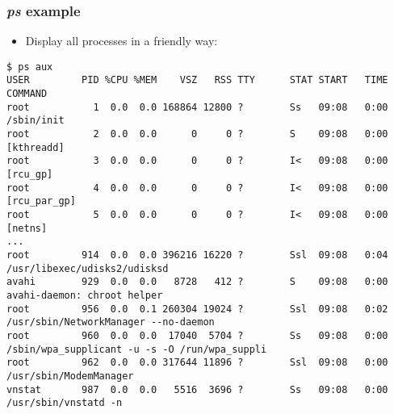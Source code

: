\begin{frame}[fragile]
  \frametitle{{\em ps} example}
  \begin{itemize}
  \frametitle{Processes with {\em ps}}
    \item Display all processes in a friendly way:
  \end{itemize}
  \begin{block}{}
    \begin{verbatim}
$ ps aux
USER         PID %CPU %MEM    VSZ   RSS TTY      STAT START   TIME COMMAND
root           1  0.0  0.0 168864 12800 ?        Ss   09:08   0:00 /sbin/init
root           2  0.0  0.0      0     0 ?        S    09:08   0:00 [kthreadd]
root           3  0.0  0.0      0     0 ?        I<   09:08   0:00 [rcu_gp]
root           4  0.0  0.0      0     0 ?        I<   09:08   0:00 [rcu_par_gp]
root           5  0.0  0.0      0     0 ?        I<   09:08   0:00 [netns]
...
root         914  0.0  0.0 396216 16220 ?        Ssl  09:08   0:04 /usr/libexec/udisks2/udisksd
avahi        929  0.0  0.0   8728   412 ?        S    09:08   0:00 avahi-daemon: chroot helper
root         956  0.0  0.1 260304 19024 ?        Ssl  09:08   0:02 /usr/sbin/NetworkManager --no-daemon
root         960  0.0  0.0  17040  5704 ?        Ss   09:08   0:00 /sbin/wpa_supplicant -u -s -O /run/wpa_suppli
root         962  0.0  0.0 317644 11896 ?        Ssl  09:08   0:00 /usr/sbin/ModemManager
vnstat       987  0.0  0.0   5516  3696 ?        Ss   09:08   0:00 /usr/sbin/vnstatd -n
    \end{verbatim}
  \end{block}
\end{frame}

